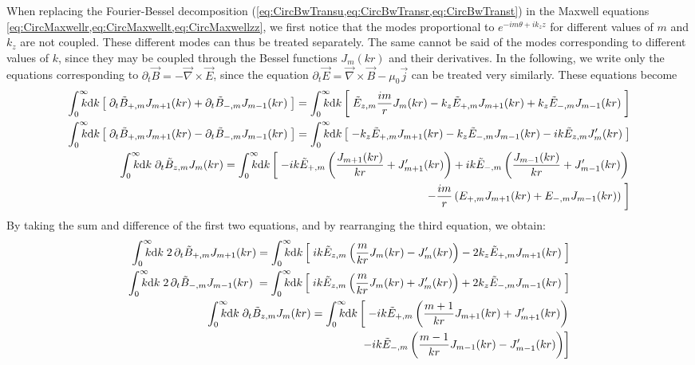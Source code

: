 When replacing the Fourier-Bessel decomposition
(\cref{eq:CircBwTransu,eq:CircBwTransr,eq:CircBwTranst}) in the
Maxwell equations \cref{eq:CircMaxwellr,eq:CircMaxwellt,eq:CircMaxwellzz}, we
first notice that the modes proportional to $e^{-im\theta +ik_z z}$ for different
values of $m$ and $k_z$ are not coupled. These different modes can
thus be treated separately. The same cannot be said of the modes
corresponding to different values of $k$, since they may be coupled
through the Bessel functions $J_m(kr)$ and their derivatives. 
In the following, we write only the equations corresponding to $\partial_t \vec{B} =
-\vec{\nabla}\times \vec{E}$, since the equation $\partial_t \vec{E} =
\vec{\nabla}\times\vec{B} - \mu_0 \vec{j}$ can be treated very
similarly. These equations become
\begin{align*}
\RInteg{k} \left[ \; \partial_t \tilde{B}_{+,m}  J_{m+1}(kr)
  + \partial_t \tilde{B}_{-,m}  J_{m-1}(kr) \; \right] =
\RInteg{k} \left[ \; \tilde{E}_{z,m} \frac{im}{r} J_m(kr) -
  k_z\tilde{E}_{+,m}J_{m+1}(kr) + k_z\tilde{E}_{-,m}J_{m-1}(kr) \;
\right] \\
\RInteg{k} \left[ \; \partial_t \tilde{B}_{+,m}  J_{m+1}(kr)
  - \partial_t \tilde{B}_{-,m}  J_{m-1}(kr) \; \right] =
\RInteg{k} \left[ \; -k_z\tilde{E}_{+,m}J_{m+1}(kr) -
  k_z\tilde{E}_{-,m}J_{m-1}(kr) - ik\tilde{E}_{z,m} J_m'(kr) \;
\right] \\
\RInteg{k}\; \partial_t \tilde{B}_{z,m}  J_{m}(kr) =
\RInteg{k} \left[ \; -ik\tilde{E}_{+,m}\left(\frac{J_{m+1}(kr)}{kr} +
    J_{m+1}'(kr) \right) + ik\tilde{E}_{-,m}\left(\frac{J_{m-1}(kr)}{kr} +
    J_{m-1}'(kr) \right) \right. \\
\qquad \left.- \frac{im}{r} \left( E_{+,m} J_{m+1}(kr) +
    E_{-,m} J_{m-1}(kr) \right) \;\right]
\end{align*}
By taking the sum and difference of the first two equations, and by
rearranging the third equation, we obtain:
\begin{align*}
\RInteg{k} \; 2 \,\partial_t \tilde{B}_{+,m}  J_{m+1}(kr) =
\RInteg{k} \left[ \; ik\tilde{E}_{z,m} \left( \frac{m}{kr} J_m(kr) -
    J_m'(kr) \right) -2 k_z\tilde{E}_{+,m}J_{m+1}(kr) \;
\right] \\
\RInteg{k} \; 2\, \partial_t \tilde{B}_{-,m}  J_{m-1}(kr) \; =
\RInteg{k} \left[ \;
   ik\tilde{E}_{z,m} \left( \frac{m}{kr} J_m(kr) +
    J_m'(kr) \right)  + 2k_z\tilde{E}_{-,m}J_{m-1}(kr) \;
\right] \\
\RInteg{k}\; \partial_t \tilde{B}_{z,m}  J_{m}(kr) =
\RInteg{k} \left[ \; -ik\tilde{E}_{+,m}\left(\frac{m+1}{kr}J_{m+1}(kr) +
    J_{m+1}'(kr) \right) \right.\\
\qquad \left. - ik\tilde{E}_{-,m}\left(\frac{m-1}{kr}J_{m-1}(kr) -
    J_{m-1}'(kr) \right) \right] 
\end{align*}
